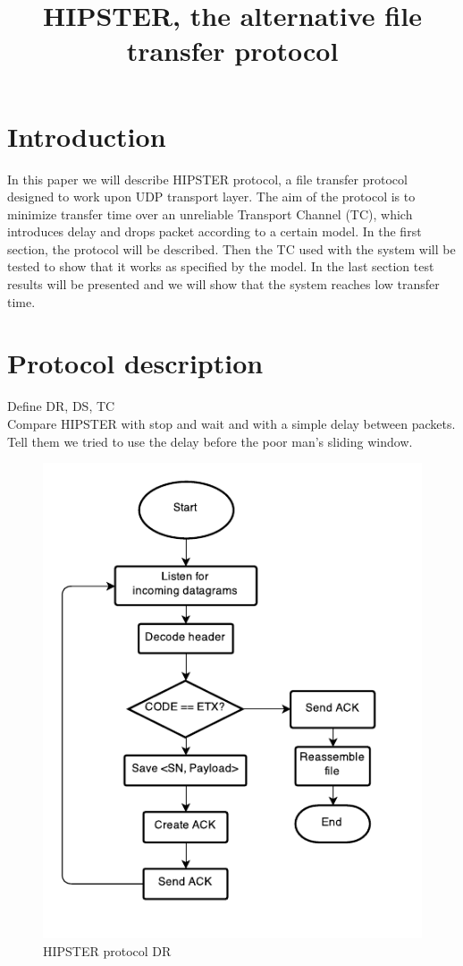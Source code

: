 \documentclass[10pt,twocolumn]{article}
\begin{document}
\title{HIPSTER, the alternative file transfer protocol}
\author{}
\date{}
\maketitle

\section{Introduction}
In this paper we will describe HIPSTER protocol, a file transfer protocol designed to work upon UDP transport layer. The aim of the protocol is to minimize transfer time over an unreliable Transport Channel (TC), which introduces delay and drops packet according to a certain model. In the first section, the protocol will be described. Then the TC used with the system will be tested to show that it works as specified by the model. In the last section test results will be presented and we will show that the system reaches low transfer time.

\section{Protocol description}

Define DR, DS, TC\\
Compare HIPSTER with stop and wait and with a simple delay between packets.\\
Tell them we tried to use the delay before the poor man's sliding window.

\begin{figure}[htp]
  \centering
  \includegraphics[width=0.75\columnwidth, keepaspectratio]{Documentation/Receiver.pdf}
  \caption{HIPSTER protocol DR}
  \label{fig:receiverFlowchart}
\end{figure}
\end{document}
